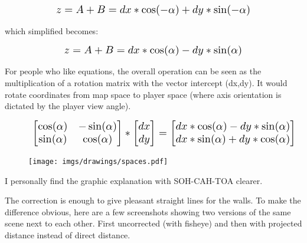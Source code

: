 \begin{figure}[H]
  \centering
  \begin{equation*}
    \scalebox{1.3}{
$z = A + B = dx * \cos(-\alpha) + dy * \sin(-\alpha) $ 
 }
  \end{equation*}
\end{figure}
which simplified becomes: 

\begin{figure}[H]
  \centering
  \begin{equation*}
    \scalebox{1.3}{
$z = A + B = dx * \cos(\alpha) - dy * \sin(\alpha) $
 }
  \end{equation*}
\end{figure}
\par
For people who like equations, the overall operation can be seen as the multiplication of a rotation matrix with the vector intercept (dx,dy). It would rotate coordinates from map space to player space (where axis orientation is dictated by the player view angle). \label{rotatematrix}
\begin{figure}[H]
  \centering
  \begin{equation*}
    \scalebox{1.3}{
    $
      \begin{bmatrix} 
        \cos(\alpha) & -\sin(\alpha) \\ 
        \sin(\alpha) & \cos(\alpha) 
      \end{bmatrix} 
       *
      \begin{bmatrix} 
        dx \\ 
        dy 
      \end{bmatrix}
       =
      \begin{bmatrix} 
        dx*\cos(\alpha) - dy*\sin(\alpha) \\ 
        dx*\sin(\alpha) + dy*\cos(\alpha) 
      \end{bmatrix} 
      $
    }
  \end{equation*}
\end{figure}

\begin{figure}[H]
\centering
 \texttt{[image: imgs/drawings/spaces.pdf]}
 \end{figure}


I personally find the graphic explanation with SOH-CAH-TOA clearer.\\
\par
The correction is enough to give pleasant straight lines for the walls. To make the difference obvious, here are a few screenshots showing two versions of the same scene next to each other. First uncorrected (with fisheye) and then with projected distance instead of direct distance.\\

